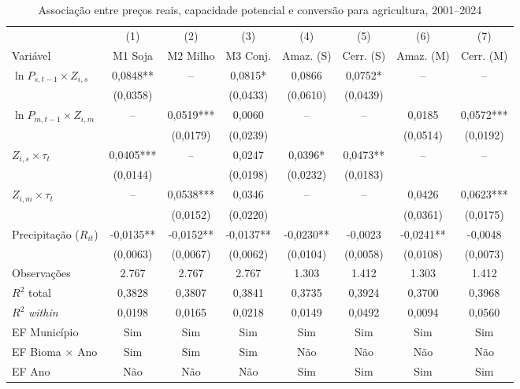 \begin{table}[htbp]
\centering
\footnotesize
\setlength{\tabcolsep}{3.5pt}
\captionstyle{\centering}
\normalcaption
\caption{Associação entre preços reais, capacidade potencial e conversão para agricultura, 2001--2024}
\label{tab:h1-principais}
\begin{tabular}{lccccccc}
\toprule
 & (1) & (2) & (3) & (4) & (5) & (6) & (7) \\
Variável & M1 Soja & M2 Milho & M3 Conj. & Amaz. (S) & Cerr. (S) & Amaz. (M) & Cerr. (M) \\
\midrule
$\ln P_{s,t-1} \times Z_{i,s}$ & 0,0848** & -- & 0,0815* & 0,0866 & 0,0752* & -- & -- \\
 & (0,0358) &  & (0,0433) & (0,0610) & (0,0439) &  &  \\
$\ln P_{m,t-1} \times Z_{i,m}$ & -- & 0,0519*** & 0,0060 & -- & -- & 0,0185 & 0,0572*** \\
 &  & (0,0179) & (0,0239) &  &  & (0,0514) & (0,0192) \\
$Z_{i,s} \times \tau_t$ & 0,0405*** & -- & 0,0247 & 0,0396* & 0,0473** & -- & -- \\
 & (0,0144) &  & (0,0198) & (0,0232) & (0,0183) &  &  \\
$Z_{i,m} \times \tau_t$ & -- & 0,0538*** & 0,0346 & -- & -- & 0,0426 & 0,0623*** \\
 &  & (0,0152) & (0,0220) &  &  & (0,0361) & (0,0175) \\
Precipitação ($R_{it}$) & -0,0135** & -0,0152** & -0,0137** & -0,0230** & -0,0023 & -0,0241** & -0,0048 \\
 & (0,0063) & (0,0067) & (0,0062) & (0,0104) & (0,0058) & (0,0108) & (0,0073) \\
\midrule
Observações & 2.767 & 2.767 & 2.767 & 1.303 & 1.412 & 1.303 & 1.412 \\
$R^2$ total & 0,3828 & 0,3807 & 0,3841 & 0,3735 & 0,3924 & 0,3700 & 0,3968 \\
$R^2$ \textit{within} & 0,0198 & 0,0165 & 0,0218 & 0,0149 & 0,0492 & 0,0094 & 0,0560 \\
EF Município & Sim & Sim & Sim & Sim & Sim & Sim & Sim \\
EF Bioma $\times$ Ano & Sim & Sim & Sim & Não & Não & Não & Não \\
EF Ano & Não & Não & Não & Sim & Sim & Sim & Sim \\
\bottomrule
\end{tabular}
\par\smallskip\begin{minipage}{\textwidth}\footnotesize

\end{minipage}
\end{table}
